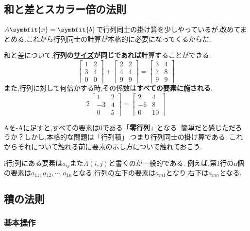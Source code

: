\subsection{和と差とスカラー倍の法則}
$A\symbfit{x}=\symbfit{b}$で行列同士の掛け算を少しやっているが,改めてまとめる.これから行列同士の計算が本格的に必要になってくるからだ.
\begin{tcolorbox}[colframe=black!80,colback=white,title={行列和と行列差の計算可能な条件,スカラー倍の計算}]
和と差について,\textbf{行列の\hyperlink{size}{サイズ}が同じであれば}計算することができる.
\[
\begin{bmatrix}
    1 & 2 \\ 3 & 4 \\ 0 & 0
\end{bmatrix}
+
\begin{bmatrix}
    2 & 2 \\ 4 & 4 \\ 9 & 9
\end{bmatrix}
=
\begin{bmatrix}
    3 & 4 \\ 7 & 8 \\ 9 & 9
\end{bmatrix}
\]
また,行列に対して何倍かする時,その係数は\textbf{すべての要素に施される}.
\[
2\begin{bmatrix}
    1 & 2 \\ -3 & 4 \\ 0 & 5
\end{bmatrix}
=
\begin{bmatrix}
    2 & 4 \\ -6 & 8 \\ 0 & 10
\end{bmatrix}
\]
\end{tcolorbox}
Aを-Aに足すと,すべての要素は0である「\textbf{零行列}」となる.
簡単だと感じただろうか？しかし,本格的な問題は「行列積」.つまり行列同士の掛け算である.
これからそれについて触れる前に要素の示し方について触れておこう.

i行j列にある要素は$a_{ij}$また$A(i,j)$と書くのが一般的である.
例えば,第1行のn個の要素は$a_{11},a_{12}, \cdots ,a_{1n}$となる.行列の左下の要素は$a_{m1}$となり,右下は$a_{mn}$となる.
\subsection{積の法則}
\subsubsection{基本操作}
